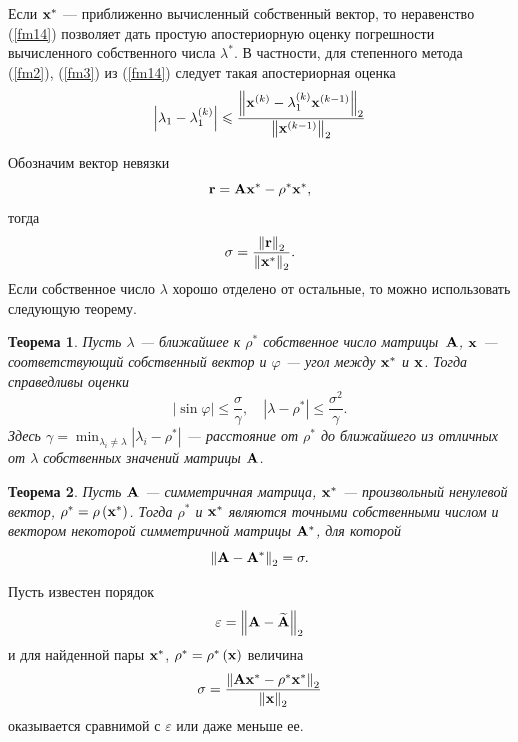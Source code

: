 \documentclass[12pt]{article}
\newtheorem{theorem}{Теорема}
\begin{document}
	Если $\bold{x}^{*}$ --- приближенно вычисленный собственный вектор, то неравенство (\ref{fm14}) позволяет дать простую апостериорную оценку погрешности вычисленного собственного числа $\lambda^{*}$. В частности, для степенного метода (\ref{fm2}), (\ref{fm3}) из (\ref{fm14}) следует такая апостериорная оценка
	\begin{equation}
		\left|\lambda_1-\lambda_1^{\left(k\right)}\right|\leqslant\frac{\left\|\bold{x}^{\left(k\right)}-\lambda_1^{\left(k\right)}{\bold{x}^{\left(k-1\right)}}\right\|_2}{\left\|\bold{x}^{\left(k-1\right)}\right\|_2}
	\end{equation}
	
	Обозначим вектор невязки
	\begin{equation}
		\bold{r}=\bold{A}\bold{x}^{*}-\rho^{*}\bold{x}^*,
	\end{equation}
	тогда
	\begin{equation}
		\sigma=\frac{\left\|\bold{r}\right\|_2}{\left\|\bold{x}^{*}\right\|_2}.
	\end{equation}
	Если собственное число $\lambda$ хорошо отделено от остальные, то можно использовать следующую теорему.
	
	\begin{theorem}
		Пусть $\lambda$ --- ближайшее к $\rho^{*}$ собственное число матрицы~$\bold{A}$, $\bold{x}$ --- соответствующий собственный вектор и $\varphi$ --- угол между $\bold{x}^{*}$ и  $\bold{x}$. Тогда справедливы оценки
		\begin{equation}
			\left|\sin\varphi\right|\leqslant\frac{\sigma}{\gamma},\quad \left|\lambda-\rho^{*}\right|\leqslant\frac{\sigma^2}{\gamma}.
		\end{equation}
		Здесь $\gamma=\min_{\lambda_i\neq\lambda}\left|\lambda_i-\rho^{*}\right|$ --- расстояние от $\rho^{*}$ до ближайшего из отличных от $\lambda$ собственных значений матрицы $\bold{A}$.
	\end{theorem}
	
	\begin{theorem}
		Пусть $\bold{A}$ --- симметричная матрица, $\bold{x}^{*}$ --- произвольный ненулевой вектор, $\rho^{*}=\rho\left(\bold{x}^{*}\right)$. Тогда $\rho^{*}$ и $\bold{x}^{*}$ являются точными собственными числом и вектором некоторой симметричной матрицы $\bold{A}^{*}$, для которой
		\begin{equation}
			\left\|\bold{A}-\bold{A}^{*}\right\|_2=\sigma.
		\end{equation}
	\end{theorem}
	Пусть известен порядок
	\begin{equation}
		\varepsilon=\left\|\bold{A}-\widetilde{\bold{A}}\right\|_2
	\end{equation}
	и для найденной пары $\bold{x}^{*}$, $\rho^{*}=\rho^{*}\left(\bold{x}\right)$ величина
	\begin{equation}
		\sigma=\frac{\left\|\bold{A}\bold{x}^{*}-\rho^{*}\bold{x}^{*}\right\|_2}{\left\|\bold{x}\right\|_2}
	\end{equation}
	оказывается сравнимой с $\varepsilon$ или даже меньше ее.
	
\end{document}
